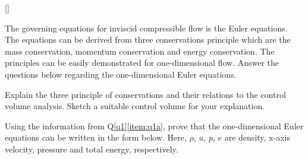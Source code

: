 
%




\question{}[\label{q1}]

The governing equations for inviscid compressible flow is the Euler equations. The equations can be derived from three conservations principle which are the mass conservation, momentum conservation and energy conservation. The principles can be easily demonstrated for one-dimensional flow. Answer the questions below regarding the one-dimensional Euler equations.


\listbeginx	%
	\item \label{item:q1a} Explain the three principle of conservations and their relations to the control volume analysis. Sketch a suitable control volume for your explanation.
	

	
	\item \label{item:q1b} Using the information from Q\ref{q1}\ref{item:q1a}, prove that the one-dimensional Euler equations can be written in the form below. Here, $\rho$, $u$, $p$, $e$ are density, x-axis velocity, pressure and total energy, respectively.
		
	
